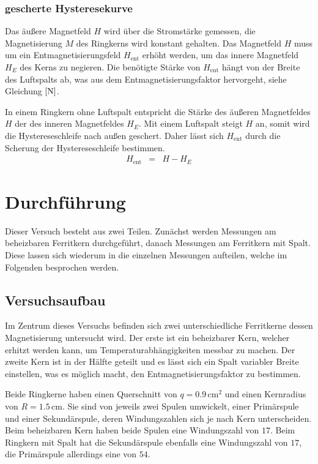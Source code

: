 \documentclass[12pt,a4paper]{scrartcl}
\numberwithin{equation}{section} %
\begin{document}
\hypertarget{gescherte-hysteresekurve}{%
\subsubsection{gescherte Hysteresekurve}\label{gescherte-hysteresekurve}}
Das äußere Magnetfeld $H$ wird über die Stromstärke gemessen, die Magnetisierung $M$ des Ringkerns wird konstant gehalten. Das Magnetfeld $H$ muss um ein Entmagnetisierungsfeld $H_\mathrm{ent}$ erhöht werden, um das innere Magnetfeld $H_E$ des Kerns zu negieren. Die benötigte Stärke von $H_\mathrm{ent}$ hängt von der Breite des Luftspalts ab, was aus dem Entmagnetisierungsfaktor hervorgeht, siehe Gleichung $\eqref{N}$.

In einem Ringkern ohne Luftspalt entspricht die Stärke des äußeren Magnetfeldes $H$ der des inneren Magnetfeldes $H_E$. Mit einem Luftspalt steigt $H$ an, somit wird die Hystereseschleife nach außen geschert. Daher lässt sich $H_\mathrm{ent}$ durch die Scherung der Hystereseschleife bestimmen.
\begin{eqnarray}
    H_\mathrm{ent} &=& H - H_E \label{Hscher}
\end{eqnarray}

\clearpage
\hypertarget{durchfuxfchrung}{%
\section{Durchführung}\label{durchfuxfchrung}}
Dieser Versuch besteht aus zwei Teilen. Zunächst werden Messungen am beheizbaren Ferritkern durchgeführt, danach Messungen am Ferritkern mit Spalt. Diese lassen sich wiederum in die einzelnen Messungen aufteilen, welche im Folgenden besprochen werden.

\hypertarget{versuchsaufbau}{%
\subsection{Versuchsaufbau}\label{versuchsaufbau}}
Im Zentrum dieses Versuchs befinden sich zwei unterschiedliche Ferritkerne dessen Magnetisierung untersucht wird. Der erste ist ein beheizbarer Kern, welcher erhitzt werden kann, um Temperaturabhängigkeiten messbar zu machen. Der zweite Kern ist in der Hälfte geteilt und es lässt sich ein Spalt variabler Breite einstellen, was es möglich macht, den Entmagnetisierungsfaktor zu bestimmen.

Beide Ringkerne haben einen Querschnitt von $q=0.9\,\mathrm{cm^2}$ und einen Kernradius von $R=1.5\,\mathrm{cm}$. Sie sind von jeweils zwei Spulen umwickelt, einer Primärspule und einer Sekundärspule, deren Windungszahlen sich je nach Kern unterscheiden. Beim beheizbaren Kern haben beide Spulen eine Windungszahl von $17$. Beim Ringkern mit Spalt hat die Sekundärspule ebenfalls eine Windungszahl von $17$, die Primärspule allerdings eine von $54$.
\end{document}
